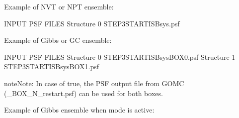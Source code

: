 \documentclass[letterpaper,10pt,english]{sphinxmanual}
\begin{document}
\begin{description}
\sphinxAtStartPar
Example of NVT or NPT ensemble:

\begin{sphinxVerbatim}[commandchars=\\\{\}]
\PYGZsh{}\PYGZsh{}\PYGZsh{}\PYGZsh{}\PYGZsh{}\PYGZsh{}\PYGZsh{}\PYGZsh{}\PYGZsh{}\PYGZsh{}\PYGZsh{}\PYGZsh{}\PYGZsh{}\PYGZsh{}\PYGZsh{}\PYGZsh{}\PYGZsh{}\PYGZsh{}\PYGZsh{}\PYGZsh{}\PYGZsh{}\PYGZsh{}\PYGZsh{}\PYGZsh{}\PYGZsh{}\PYGZsh{}\PYGZsh{}\PYGZsh{}\PYGZsh{}\PYGZsh{}\PYGZsh{}\PYGZsh{}\PYGZsh{}
\PYGZsh{} INPUT PSF FILES
\PYGZsh{}\PYGZsh{}\PYGZsh{}\PYGZsh{}\PYGZsh{}\PYGZsh{}\PYGZsh{}\PYGZsh{}\PYGZsh{}\PYGZsh{}\PYGZsh{}\PYGZsh{}\PYGZsh{}\PYGZsh{}\PYGZsh{}\PYGZsh{}\PYGZsh{}\PYGZsh{}\PYGZsh{}\PYGZsh{}\PYGZsh{}\PYGZsh{}\PYGZsh{}\PYGZsh{}\PYGZsh{}\PYGZsh{}\PYGZsh{}\PYGZsh{}\PYGZsh{}\PYGZsh{}\PYGZsh{}\PYGZsh{}\PYGZsh{}
Structure   0   STEP3\PYGZus{}START\PYGZus{}ISB\PYGZus{}sys.psf
\end{sphinxVerbatim}

\sphinxAtStartPar
Example of Gibbs or GC ensemble:

\begin{sphinxVerbatim}[commandchars=\\\{\}]
\PYGZsh{}\PYGZsh{}\PYGZsh{}\PYGZsh{}\PYGZsh{}\PYGZsh{}\PYGZsh{}\PYGZsh{}\PYGZsh{}\PYGZsh{}\PYGZsh{}\PYGZsh{}\PYGZsh{}\PYGZsh{}\PYGZsh{}\PYGZsh{}\PYGZsh{}\PYGZsh{}\PYGZsh{}\PYGZsh{}\PYGZsh{}\PYGZsh{}\PYGZsh{}\PYGZsh{}\PYGZsh{}\PYGZsh{}\PYGZsh{}\PYGZsh{}\PYGZsh{}\PYGZsh{}\PYGZsh{}\PYGZsh{}\PYGZsh{}
\PYGZsh{} INPUT PSF FILES
\PYGZsh{}\PYGZsh{}\PYGZsh{}\PYGZsh{}\PYGZsh{}\PYGZsh{}\PYGZsh{}\PYGZsh{}\PYGZsh{}\PYGZsh{}\PYGZsh{}\PYGZsh{}\PYGZsh{}\PYGZsh{}\PYGZsh{}\PYGZsh{}\PYGZsh{}\PYGZsh{}\PYGZsh{}\PYGZsh{}\PYGZsh{}\PYGZsh{}\PYGZsh{}\PYGZsh{}\PYGZsh{}\PYGZsh{}\PYGZsh{}\PYGZsh{}\PYGZsh{}\PYGZsh{}\PYGZsh{}\PYGZsh{}\PYGZsh{}
Structure   0   STEP3\PYGZus{}START\PYGZus{}ISB\PYGZus{}sys\PYGZus{}BOX\PYGZus{}0.psf
Structure   1   STEP3\PYGZus{}START\PYGZus{}ISB\PYGZus{}sys\PYGZus{}BOX\PYGZus{}1.psf
\end{sphinxVerbatim}

\begin{sphinxadmonition}{note}{Note:}
\sphinxAtStartPar
In case of  true, the PSF output file from GOMC (\_BOX\_N\_restart.psf) can be used for both boxes.
\end{sphinxadmonition}

\sphinxAtStartPar
Example of Gibbs ensemble when  mode is active:


\end{description}
\end{document}
